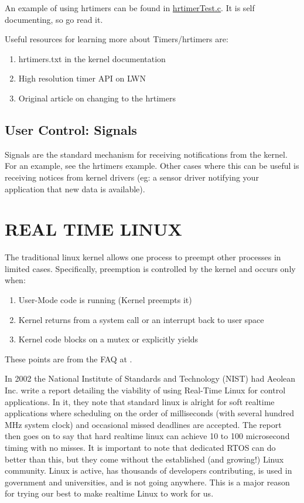 \documentclass{article}
\begin{document}
An example of using hrtimers can be found in \href{https://github.com/ianohara/rt-linux-examples/blob/master/src/hrtimerTest.c}{hrtimerTest.c}.  It is self documenting, so go read it.

Useful resources for learning more about Timers/hrtimers are:
\begin{enumerate}
\item hrtimers.txt in the kernel documentation \cite{highResTimerDoc}
\item High resolution timer API on LWN \cite{highResTimerAPI}
\item Original article on changing to the hrtimers \cite{newApproachToKernelTimers}
\end{enumerate}
\subsection{User Control: Signals}
Signals are the standard mechanism for receiving notifications from the kernel.  For an example, see the hrtimers example.  Other cases where this can be useful is receiving notices from kernel drivers (eg: a sensor driver notifying your application that new data is available).

\section{REAL TIME LINUX}
The traditional linux kernel allows one process to preempt other processes in limited cases.  Specifically, preemption is controlled by the kernel and occurs only when:

\begin{enumerate}
\item User-Mode code is running (Kernel preempts it)
\item Kernel returns from a system call or an interrupt back to user space
\item Kernel code blocks on a mutex or explicitly yields
\end{enumerate}
These points are from the FAQ at \cite{RealTimeLinux}.

In 2002 the National Institute of Standards and Technology (NIST) had Aeolean Inc. write a report detailing the viability of using Real-Time Linux for control applications. \cite{IntroLinuxForRealTime}  In it, they note that standard linux is alright for soft realtime applications where scheduling on the order of milliseconds (with several hundred MHz system clock) and occasional missed deadlines are accepted.  The report then goes on to say that hard realtime linux can achieve 10 to 100 microsecond timing with no misses.  It is important to note that dedicated RTOS can do better than this, but they come without the established (and growing!) Linux community.  Linux is active, has thousands of developers contributing, is used in government and universities, and is not going anywhere.  This is a major reason for trying our best to make realtime Linux to work for us.
\end{document}
